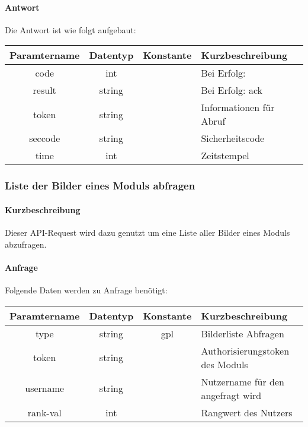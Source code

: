 \paragraph{Antwort}Die Antwort ist wie folgt aufgebaut:
\begin{table}[H]
	\begin{tabular}{|c|c|c|p{6.5cm}|}
		\hline
		\textbf{Paramtername} & \textbf{Datentyp} & \textbf{Konstante} & \textbf{Kurzbeschreibung}            \\ \hline                
		code                & int              &                 & Bei Erfolg: {\glqq 0\grqq} \\ \hline
		result              & string           &                 & Bei Erfolg: {\glqq ack\grqq} \\ \hline
		token               & string           &                 & Informationen für Abruf \\ \hline
		seccode             & string           &                 & Sicherheitscode \\ \hline
		time                & int              &                 & Zeitstempel \\ \hline
	\end{tabular}
\end{table}
\subsubsection{Liste der Bilder eines Moduls abfragen}
\paragraph{Kurzbeschreibung}Dieser API-Request wird dazu genutzt um eine Liste aller Bilder eines Moduls abzufragen.
\paragraph{Anfrage}Folgende Daten werden zu Anfrage benötigt:
\begin{table}[H]
	\begin{tabular}{|c|c|c|p{6.5cm}|}
		\hline
		\textbf{Paramtername} & \textbf{Datentyp} & \textbf{Konstante} & \textbf{Kurzbeschreibung}                                                                                               \\ \hline
		type                & string            & gpl                & Bilderliste Abfragen \\ \hline
		token               & string            &                    & Authorisierungstoken des Moduls \\ \hline
		username            & string            &                    & Nutzername für den angefragt wird \\ \hline
		rank-val            & int               &                    & Rangwert des Nutzers \\ \hline
	\end{tabular}
\end{table}
